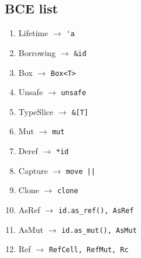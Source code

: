 \subsection{\label{sec:appendix}BCE list}

\begin{enumerate}
    \item Lifetime $\rightarrow$ \verb+'a+
    \item Borrowing $\rightarrow$ \verb+&id+
    \item Box $\rightarrow$ \verb+Box<T>+
    \item Unsafe $\rightarrow$ \verb+unsafe+
    \item TypeSlice $\rightarrow$ \verb+&[T]+
    \item Mut $\rightarrow$ \verb+mut+
    \item Deref $\rightarrow$ \verb+*id+
    \item Capture $\rightarrow$ \verb+move ||+
    \item Clone $\rightarrow$ \verb+clone+
    \item AsRef $\rightarrow$ \verb+id.as_ref(), AsRef+
    \item AsMut $\rightarrow$ \verb+id.as_mut(), AsMut+
    \item Ref $\rightarrow$ \verb+RefCell, RefMut, Rc+
\end{enumerate}